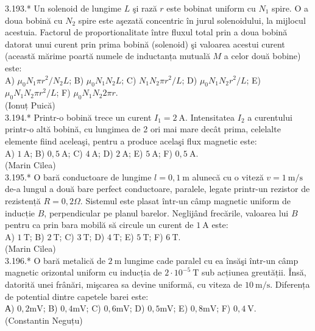 \documentclass[10pt]{article}
\begin{document}
3.193.* Un solenoid de lungime $L$ şi rază $r$ este bobinat uniform cu $N_{1}$ spire. O a doua bobină cu $N_{2}$ spire este aşezată concentric în jurul solenoidului, la mijlocul acestuia. Factorul de proportionalitate între fluxul total prin a doua bobină datorat unui curent prin prima bobină (solenoid) şi valoarea acestui curent (această mărime poartă numele de inductanța mutuală $M$ a celor două bobine) este:\\ A) $\mu_{0} N_{1} \pi r^{2} / N_{2} L$; B) $\mu_{0} N_{1} N_{2} L$; C) $N_{1} N_{2} \pi r^{2} / L$; D) $\mu_{0} N_{1} N_{2} r^{2} / L$; E) $\mu_{0} N_{1} N_{2} \pi r^{2} / L$; F) $\mu_{0} N_{1} N_{2} 2 \pi r$.\\ (Ionuț Puică)\\

3.194.* Printr-o bobină trece un curent $I_{1}=2 \mathrm{~A}$. Intensitatea $I_{2}$ a curentului printr-o altă bobină, cu lungimea de 2 ori mai mare decât prima, celelalte elemente fiind aceleaşi, pentru a produce acelaşi flux magnetic este:\\ A) $1 \mathrm{~A}$; B) $0,5 \mathrm{~A}$; C) $4 \mathrm{~A}$; D) $2 \mathrm{~A}$; E) $5 \mathrm{~A}$; F) $0,5 \mathrm{~A}$.\\ (Marin Cilea)\\

3.195.* O bară conductoare de lungime $l=0,1 \mathrm{~m}$ alunecă cu o viteză $v=1 \mathrm{~m} / \mathrm{s}$ de-a lungul a două bare perfect conductoare, paralele, legate printr-un rezistor de rezistență $R=0,2 \Omega$. Sistemul este plasat într-un câmp magnetic uniform de inducție $B$, perpendicular pe planul barelor. Neglijând frecările, valoarea lui $B$ pentru ca prin bara mobilă să circule un curent de $1 \mathrm{~A}$ este:\\ A) $1 \mathrm{~T}$; B) $2 \mathrm{~T}$; C) $3 \mathrm{~T}$; D) $4 \mathrm{~T}$; E) $5 \mathrm{~T}$; F) $6 \mathrm{~T}$.\\ (Marin Cilea)\\

3.196.* O bară metalică de $2 \mathrm{~m}$ lungime cade paralel cu ea însăşi într-un câmp magnetic orizontal uniform cu inducția de $2 \cdot 10^{-5} \mathrm{~T}$ sub acțiunea greutății. Însă, datorită unei frânări, mişcarea sa devine uniformă, cu viteza de $10 \mathrm{~m} / \mathrm{s}$. Diferența de potential dintre capetele barei este:\\ А) $0,2 \mathrm{mV}$; B) $0,4 \mathrm{mV}$; C) $0,6 \mathrm{mV}$; D) $0,5 \mathrm{mV}$; E) $0,8 \mathrm{mV}$; F) $0,4 \mathrm{~V}$.\\ (Constantin Neguțu)\\
\end{document}
